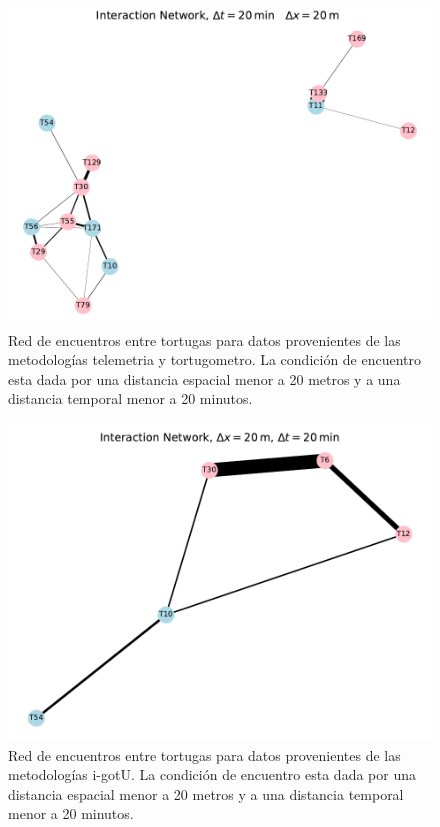 \begin{figure}[ht]
    \begin{center}
       
   
    \includegraphics[width=\imsize]{Chap2/red_interaccion_20min_campanas.pdf}
\end{center}
    \caption[Red de encuentros entre tortugas utilizando telemetria y tortugometro.]{Red de encuentros entre tortugas para datos provenientes de las metodologías telemetria y tortugometro. La condición de encuentro esta dada por una distancia espacial menor a 20 metros y a una distancia temporal menor a 20 minutos.}
    \label{fig:redInteraccion20mincampanas}
\end{figure}



\begin{figure}[ht]
    \begin{center}
       
   
    \includegraphics[width=\imsize]{Chap2/red_interaccion_20min_IGOTO.pdf}
\end{center}
    \caption[Red de encuentros entre tortugas utilizando i-gotU.]{Red de encuentros entre tortugas para datos provenientes de las metodologías i-gotU. La condición de encuentro esta dada por una distancia espacial menor a 20 metros y a una distancia temporal menor a 20 minutos.}
    \label{fig:redInteraccion20igotu}
\end{figure}


